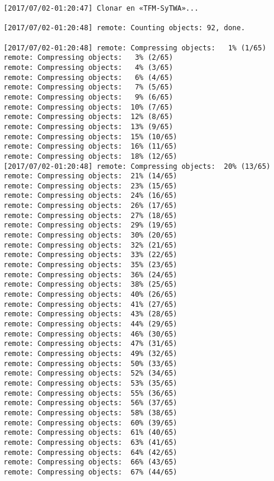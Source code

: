 \begin{verbatim}
[2017/07/02-01:20:47] Clonar en «TFM-SyTWA»...

[2017/07/02-01:20:48] remote: Counting objects: 92, done.        

[2017/07/02-01:20:48] remote: Compressing objects:   1% (1/65)           
remote: Compressing objects:   3% (2/65)           
remote: Compressing objects:   4% (3/65)           
remote: Compressing objects:   6% (4/65)           
remote: Compressing objects:   7% (5/65)           
remote: Compressing objects:   9% (6/65)           
remote: Compressing objects:  10% (7/65)           
remote: Compressing objects:  12% (8/65)           
remote: Compressing objects:  13% (9/65)           
remote: Compressing objects:  15% (10/65)           
remote: Compressing objects:  16% (11/65)           
remote: Compressing objects:  18% (12/65)           
[2017/07/02-01:20:48] remote: Compressing objects:  20% (13/65)           
remote: Compressing objects:  21% (14/65)           
remote: Compressing objects:  23% (15/65)           
remote: Compressing objects:  24% (16/65)           
remote: Compressing objects:  26% (17/65)           
remote: Compressing objects:  27% (18/65)           
remote: Compressing objects:  29% (19/65)           
remote: Compressing objects:  30% (20/65)           
remote: Compressing objects:  32% (21/65)           
remote: Compressing objects:  33% (22/65)           
remote: Compressing objects:  35% (23/65)           
remote: Compressing objects:  36% (24/65)           
remote: Compressing objects:  38% (25/65)           
remote: Compressing objects:  40% (26/65)           
remote: Compressing objects:  41% (27/65)           
remote: Compressing objects:  43% (28/65)           
remote: Compressing objects:  44% (29/65)           
remote: Compressing objects:  46% (30/65)           
remote: Compressing objects:  47% (31/65)           
remote: Compressing objects:  49% (32/65)           
remote: Compressing objects:  50% (33/65)           
remote: Compressing objects:  52% (34/65)           
remote: Compressing objects:  53% (35/65)           
remote: Compressing objects:  55% (36/65)           
remote: Compressing objects:  56% (37/65)           
remote: Compressing objects:  58% (38/65)           
remote: Compressing objects:  60% (39/65)           
remote: Compressing objects:  61% (40/65)           
remote: Compressing objects:  63% (41/65)           
remote: Compressing objects:  64% (42/65)           
remote: Compressing objects:  66% (43/65)           
remote: Compressing objects:  67% (44/65)           

\end{verbatim}
